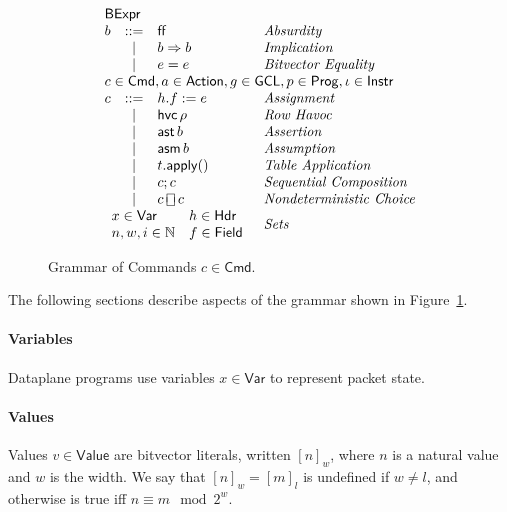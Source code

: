 \documentclass{article}
\newcommand{\FALSE}{\mathsf{ff}}
\newcommand{\Value}{\mathsf{Value}}
\newcommand{\BExpr}{\mathsf{BExpr}}
\newcommand{\Cmd}{\mathsf{Cmd}}
\newcommand{\Action}{\mathsf{Action}}
\newcommand{\Instr}{\mathsf{Instr}}
\newcommand{\Prog}{\mathsf{Prog}}
\newcommand{\GCL}{\mathsf{GCL}}
\newcommand{\Hdr}{\mathsf{Hdr}}
\newcommand{\Field}{\mathsf{Field}}
\newcommand{\Var}{\mathsf{Var}}
\newcommand{\assert}{\mathop{\mathsf{ast}}}
\newcommand{\assume}{\mathop{\mathsf{asm}}}
\newcommand{\apply}{\mathsf{apply}}
\newcommand{\choiceop}{\rotatebox[origin=c]{90}{$\sqsubset\!\!\!\sqsupset$}}
\newcommand{\choice}{\mathbin{\choiceop}}
\newcommand{\havoc}[1]{\mathop{\mathsf{hvc}}#1}
\theoremstyle{plain}
\theoremstyle{definition}
\theoremstyle{remark}
\begin{document}
\begin{figure}[htp]
\[\begin{array}{lclll}
    \multicolumn{3}{l}{\BExpr} \\
    b & ::= & \FALSE  & \textit{Absurdity}\\
      & \mid & b \Rightarrow b & \textit{Implication}\\
    & \mid & e = e & \textit{Bitvector Equality}\\
    \multicolumn{4}{l}{c \in \Cmd, a \in \Action, g \in \GCL, p \in \Prog, \iota \in \Instr } \\
    c & ::=  & h.f := e & \textit{Assignment} \\
      & \mid & \havoc \rho & \textit{Row Havoc} \\
      & \mid & \assert b & \textit{Assertion}\\
      & \mid & \assume b & \textit{Assumption} \\
      & \mid & t.\apply() & \textit{Table Application} \\
      & \mid & c;c & \textit{Sequential Composition} \\
      & \mid & c \choice c & \textit{Nondeterministic Choice} \\
    \multicolumn{3}{l}{
      \begin{array}{ll}
        x \in \Var & h \in \Hdr\\
        n,w,i \in \mathbb{N} & f \in \Field
    \end{array}} & \textit{Sets }\\
  \end{array}
\]
\caption{Grammar of Commands $c \in \Cmd$.}
\label{fig:grammar}
\end{figure}

The following sections describe aspects of the grammar shown in Figure~\ref{fig:grammar}.


\paragraph{Variables}
Dataplane programs use variables $x \in \Var$ to represent packet state.

\paragraph{Values}
Values $v \in \Value$ are bitvector literals, written $[n]_w$, where $n$
is a natural value and $w$ is the width. We say that $[n]_w = [m]_l$ is
undefined if $w \neq l$, and otherwise is true iff $n \equiv m \mod 2^w$.
\end{document}
